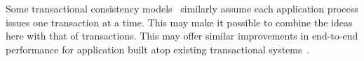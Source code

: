 
Some transactional consistency
models~\cite{papadimitriou1979serializability,adya1999weakcons} similarly assume 
each application process issues one transaction at a time. This may 
make it possible to combine the ideas here with that of transactions. 
This may offer similar improvements in end-to-end 
performance for application built atop existing transactional 
systems~\cite{thomson2014calvin,mahmoud2013replicatedCommit,zhang2018tapir,mu2014rococo,mu2016janus,kraska2013mdcc,ren2019slog,taft2020crdb,yan2018carousel}.





